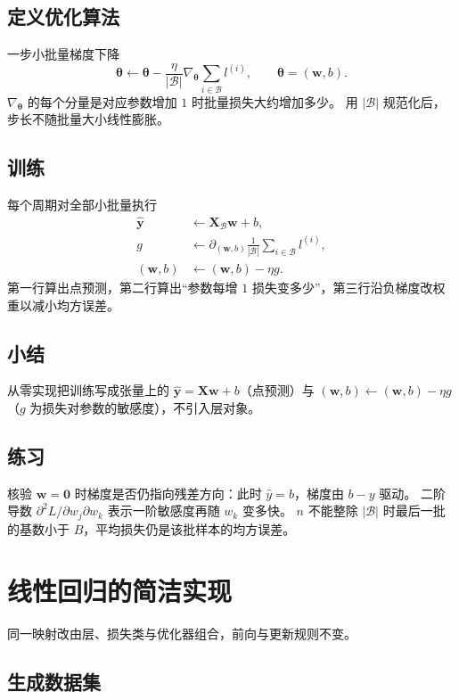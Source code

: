 \subsection{定义优化算法}

一步小批量梯度下降
\[
\bm{\theta}
\leftarrow
\bm{\theta}
-
\frac{\eta}{|\mathcal{B}|}\nabla_{\bm{\theta}}
\sum_{i\in\mathcal{B}}l^{(i)},
\qquad
\bm{\theta}=(\bm{w},b).
\]
$\nabla_{\bm{\theta}}$ 的每个分量是对应参数增加 $1$ 时批量损失大约增加多少。
用 $|\mathcal{B}|$ 规范化后，步长不随批量大小线性膨胀。

\subsection{训练}

每个周期对全部小批量执行
\begin{align*}
\hat{\bm{y}}&\leftarrow \bm{X}_{\mathcal{B}}\bm{w}+b,\\
g&\leftarrow
\partial_{(\bm{w},b)}\frac{1}{|\mathcal{B}|}\sum_{i\in\mathcal{B}}l^{(i)},\\
(\bm{w},b)&\leftarrow(\bm{w},b)-\eta g.
\end{align*}
第一行算出点预测，第二行算出“参数每增 $1$ 损失变多少”，第三行沿负梯度改权重以减小均方误差。

\subsection{小结}

从零实现把训练写成张量上的 $\hat{\bm{y}}=\bm{X}\bm{w}+b$（点预测）与
$(\bm{w},b)\leftarrow(\bm{w},b)-\eta g$（$g$ 为损失对参数的敏感度），不引入层对象。

\subsection{练习}

核验 $\bm{w}=\bm{0}$ 时梯度是否仍指向残差方向：此时 $\hat{y}=b$，梯度由 $b-y$ 驱动。
二阶导数 $\partial^2 L/\partial w_j\partial w_k$ 表示一阶敏感度再随 $w_k$ 变多快。
$n$ 不能整除 $|\mathcal{B}|$ 时最后一批的基数小于 $B$，平均损失仍是该批样本的均方误差。

\section{线性回归的简洁实现}

同一映射改由层、损失类与优化器组合，前向与更新规则不变。

\subsection{生成数据集}

